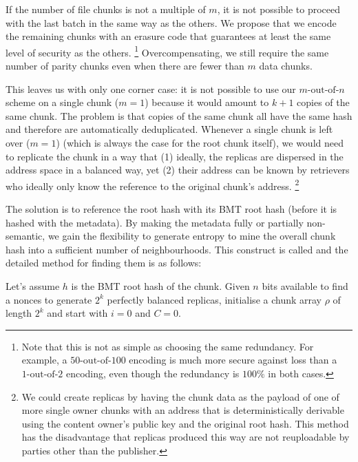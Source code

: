 If the number of file chunks is not a multiple of $m$, it is not possible to proceed with the last batch in the same way as the others. We propose that we encode the remaining chunks with an erasure code that guarantees at least the same level of security as the others.%
%
\footnote{Note that this is not as simple as choosing the same redundancy. For example, a $50\text{-out-of-}100$ encoding is much more secure against loss than a $1\text{-out-of-}2$ encoding, even though the redundancy is $100\%$ in both cases.} 
%
Overcompensating, we still require the same number of parity chunks even when there are fewer than $m$ data chunks.

This leaves us with only one corner case: it is not possible to use our $m\text{-out-of-}n$ scheme on a single chunk ($m=1$) because it would amount to $k+1$ copies of the same chunk. The problem is that copies of the same chunk all have the same hash and therefore are automatically deduplicated. Whenever a single chunk is left over ($m=1$) (which is always the case for the root chunk itself), we would need to replicate the chunk in a way that (1) ideally, the replicas are dispersed in the address space in a balanced way, yet (2) their address can be known by retrievers who ideally only know the reference to the original chunk's address.%
%
\footnote{We could create replicas by having the chunk data as the payload of one of more single owner chunks with an address that is deterministically derivable using the content owner's public key and the original root hash. This method has the disadvantage that replicas produced this way are not reuploadable by parties other than the publisher.}

The solution is to reference the root hash with its BMT root hash (before it is hashed with the metadata). By making the metadata fully or partially non-semantic, we gain the flexibility to generate entropy to mine the overall chunk hash into a sufficient number of neighbourhoods. This construct is called  and the detailed method for finding them is as follows:

Let's assume $h$ is the BMT root hash of the chunk.
Given $n$ bits available to find a nonces to generate  $2^k$  perfectly balanced replicas, initialise a chunk array $\rho$ of length $2^k$ and start with $i=0$ and $C=0$.


